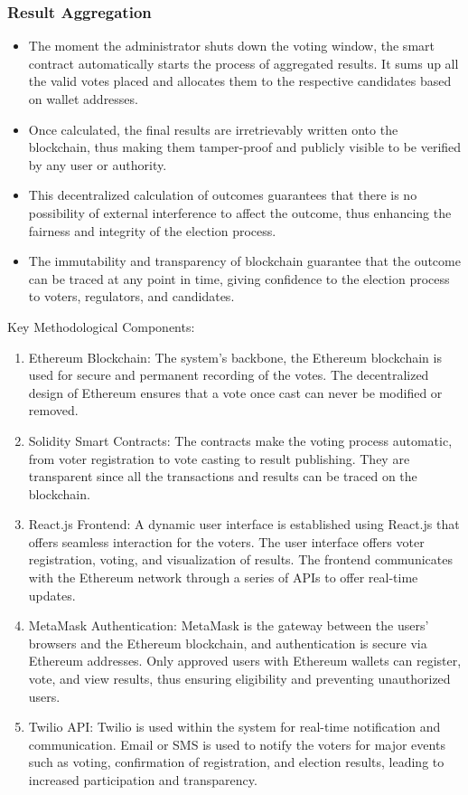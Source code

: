 \documentclass[conference]{IEEEtran}
\begin{document}
\subsubsection{Result Aggregation}
\begin{itemize}
    \item The moment the administrator shuts down the voting window, the smart contract automatically starts the process of aggregated results. It sums up all the valid votes placed and allocates them to the respective candidates based on wallet addresses.
\item Once calculated, the final results are irretrievably written onto the blockchain, thus making them tamper-proof and publicly visible to be verified by any user or authority. 
\item This decentralized calculation of outcomes guarantees that there is no possibility of external interference to affect the outcome, thus enhancing the fairness and integrity of the election process. 
\item The immutability and transparency of blockchain guarantee that the outcome can be traced at any point in time, giving confidence to the election process to voters, regulators, and candidates.

\end{itemize}
Key Methodological Components:
\begin{enumerate}
    \item Ethereum Blockchain: The system's backbone, the Ethereum blockchain is used for secure and permanent recording of the votes. The decentralized design of Ethereum ensures that a vote once cast can never be modified or removed.
\item Solidity Smart Contracts: The contracts make the voting process automatic, from voter registration to vote casting to result publishing. They are transparent since all the transactions and results can be traced on the blockchain.
\item React.js Frontend: A dynamic user interface is established using React.js that offers seamless interaction for the voters. The user interface offers voter registration, voting, and visualization of results. The frontend communicates with the Ethereum network through a series of APIs to offer real-time updates.
\item MetaMask Authentication: MetaMask is the gateway between the users' browsers and the Ethereum blockchain, and authentication is secure via Ethereum addresses. Only approved users with Ethereum wallets can register, vote, and view results, thus ensuring eligibility and preventing unauthorized users.
\item Twilio API: Twilio is used within the system for real-time notification and communication. Email or SMS is used to notify the voters for major events such as voting, confirmation of registration, and election results, leading to increased participation and transparency.


    
\end{enumerate}
\end{document}
